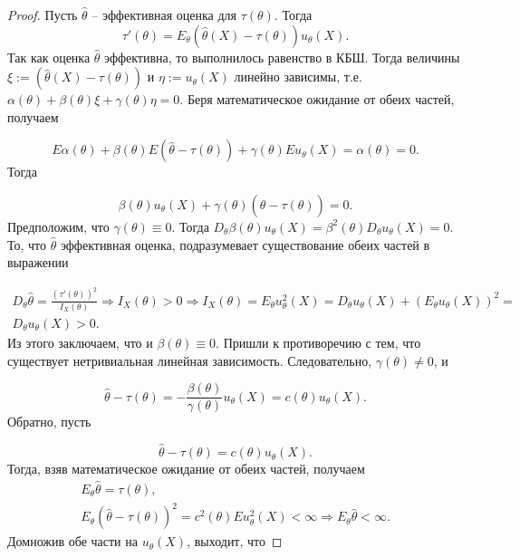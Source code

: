 \begin{proof}
Пусть $\displaystyle \hat{\theta }$ -- эффективная оценка для $\displaystyle \tau ( \theta )$. Тогда
\begin{equation*}
\tau '( \theta ) =E_{\theta }(\hat{\theta }( X) -\tau ( \theta )) u_{\theta }( X) .
\end{equation*}
Так как оценка $\displaystyle \hat{\theta }$ эффективна, то выполнилось равенство в КБШ. Тогда величины $\displaystyle \xi :=(\hat{\theta }( X) -\tau ( \theta ))$ и $\displaystyle \eta :=u_{\theta }( X)$ линейно зависимы, т.е. $\displaystyle \alpha ( \theta ) +\beta ( \theta ) \xi +\gamma ( \theta ) \eta =0$. Беря математическое ожидание от обеих частей, получаем


\begin{equation*}
E\alpha ( \theta ) +\beta ( \theta ) E(\hat{\theta } -\tau ( \theta )) +\gamma ( \theta ) Eu_{\theta }( X) =\alpha ( \theta ) =0.
\end{equation*}
Тогда


\begin{equation*}
\beta ( \theta ) u_{\theta }( X) +\gamma ( \theta )(\hat{\theta } -\tau ( \theta )) =0.
\end{equation*}
Предположим, что $\displaystyle \gamma ( \theta ) \equiv 0$. Тогда $\displaystyle D_{\theta } \beta ( \theta ) u_{\theta }( X) =\beta ^{2}( \theta ) D_{\theta } u_{\theta }( X) =0$. То, что $\displaystyle \hat{\theta }$ эффективная оценка, подразумевает существование обеих частей в выражении


\begin{gather*}
D_{\theta }\hat{\theta } =\frac{( \tau '( \theta ))^{2}}{I_{X}( \theta )} \Rightarrow I_{X}( \theta )  >0\Rightarrow I_{X}( \theta ) =E_{\theta } u_{\theta }^{2}( X) =D_{\theta } u_{\theta }( X) +( E_{\theta } u_{\theta }( X))^{2} =\\
D_{\theta } u_{\theta }( X)  >0.
\end{gather*}
Из этого заключаем, что и $\displaystyle \beta ( \theta ) \equiv 0$. Пришли к противоречию с тем, что существует нетривиальная линейная зависимость. Следовательно, $\displaystyle \gamma ( \theta ) \neq 0$, и


\begin{equation*}
\hat{\theta } -\tau ( \theta ) =-\frac{\beta ( \theta )}{\gamma ( \theta )} u_{\theta }( X) =c( \theta ) u_{\theta }( X) .
\end{equation*}
Обратно, пусть


\begin{equation*}
\hat{\theta } -\tau ( \theta ) =c( \theta ) u_{\theta }( X) .
\end{equation*}
Тогда, взяв математическое ожидание от обеих частей, получаем
\begin{gather*}
E_{\theta }\hat{\theta } =\tau ( \theta ) ,\\
E_{\theta }(\hat{\theta } -\tau ( \theta ))^{2} =c^{2}( \theta ) Eu_{\theta }^{2}( X) < \infty \Rightarrow E_{\theta }\hat{\theta } < \infty .
\end{gather*}
Домножив обе части на $\displaystyle u_{\theta }( X)$, выходит, что



\end{proof}
